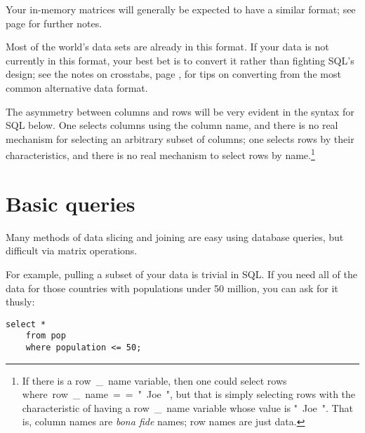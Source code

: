 Your in-memory matrices will generally be expected to have a similar
format; see page \pageref{dataformats} for further notes.

Most of the world's data sets are already in this format. If your data 
is not currently in this format, your best bet is to convert it rather
than fighting SQL's design; see
the notes on crosstabs, page \pageref{crosstabs}, for tips on
converting from the most common alternative data format.

The asymmetry between columns and rows will be very
evident in the syntax for SQL below. 
One selects columns using the
column name, and there is no real mechanism for selecting an arbitrary
subset of columns; one selects rows by their characteristics, and there
is no real mechanism to select rows by name.\footnote{If there is a
\si{row\_name} variable, then one could select rows \si{where
row\_name == "Joe"}, but that is simply selecting rows with the
characteristic of having a \si{row\_name} variable whose value is
\si{"Joe"}. That is, column names are {\it bona fide} names; row
names are just data.}

\section{Basic queries}
Many methods of data slicing and joining are easy using database queries,
but difficult via matrix operations.


For example, pulling a subset of your data is trivial in SQL. If
you need all of the data for those countries with populations under 50
million, you can ask for it thusly:
\begin{lstlisting}
select * 
    from pop
    where population <= 50;
\end{lstlisting}

